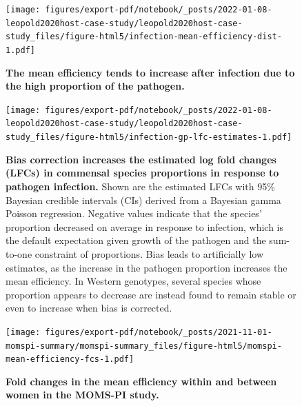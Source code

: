 \documentclass[
]{article}
\begin{document}
\begin{figure}
\centering
\texttt{[image: figures/export-pdf/notebook/\_posts/2022-01-08-leopold2020host-case-study/leopold2020host-case-study\_files/figure-html5/infection-mean-efficiency-dist-1.pdf]}
\caption{\label{fig:leopold2020host-infection-mean-efficiency-dist}\textbf{The mean efficiency tends to increase after infection due to the high proportion of the pathogen.}}
\end{figure}



\begin{figure}
\centering
\texttt{[image: figures/export-pdf/notebook/\_posts/2022-01-08-leopold2020host-case-study/leopold2020host-case-study\_files/figure-html5/infection-gp-lfc-estimates-1.pdf]}
\caption{\label{fig:leopold2020host-infection-lfc}\textbf{Bias correction increases the estimated log fold changes (LFCs) in commensal species proportions in response to pathogen infection.} Shown are the estimated LFCs with 95\% Bayesian credible intervals (CIs) derived from a Bayesian gamma Poisson regression. Negative values indicate that the species' proportion decreased on average in response to infection, which is the default expectation given growth of the pathogen and the sum-to-one constraint of proportions. Bias leads to artificially low estimates, as the increase in the pathogen proportion increases the mean efficiency. In Western genotypes, several species whose proportion appears to decrease are instead found to remain stable or even to increase when bias is corrected.}
\end{figure}



\begin{figure}
\centering
\texttt{[image: figures/export-pdf/notebook/\_posts/2021-11-01-momspi-summary/momspi-summary\_files/figure-html5/momspi-mean-efficiency-fcs-1.pdf]}
\caption{\label{fig:momspi-mean-efficiency-fcs}\textbf{Fold changes in the mean efficiency within and between women in the MOMS-PI study.}}
\end{figure}
\end{document}
